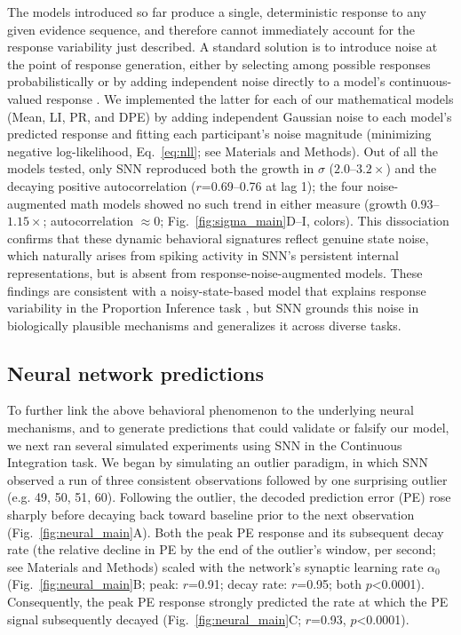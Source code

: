 \documentclass[12pt]{article}
\begin{document}
The models introduced so far produce a single, deterministic response to any given evidence sequence, and therefore cannot immediately account for the response variability just described. A standard solution is to introduce noise at the point of response generation, either by selecting among possible responses probabilistically \cite{sutton2018reinforcement} or by adding independent noise directly to a model's continuous-valued response \cite{nassar2010approximately, piray2021model}. We implemented the latter for each of our mathematical models (Mean, LI, PR, and DPE) by adding independent Gaussian noise to each model's predicted response and fitting each participant's noise magnitude (minimizing negative log-likelihood, Eq.~\ref{eq:nll}; see Materials and Methods). Out of all the models tested, only SNN reproduced both the growth in $\sigma$ ($2.0$--$3.2\times$) and the decaying positive autocorrelation ($r$=0.69--0.76 at lag 1); the four noise-augmented math models showed no such trend in either measure (growth $0.93$--$1.15\times$; autocorrelation $\approx0$; Fig.~\ref{fig:sigma_main}D--I, colors). This dissociation confirms that these dynamic behavioral signatures reflect genuine state noise, which naturally arises from spiking activity in SNN's persistent internal representations, but is absent from response-noise-augmented models. These findings are consistent with a noisy-state-based model that explains response variability in the Proportion Inference task \cite{prat2024imprecise}, but SNN grounds this noise in biologically plausible mechanisms and generalizes it across diverse tasks.

\subsection{Neural network predictions}
To further link the above behavioral phenomenon to the underlying neural mechanisms, and to generate predictions that could validate or falsify our model, we next ran several simulated experiments using SNN in the Continuous Integration task. We began by simulating an outlier paradigm, in which SNN observed a run of three consistent observations followed by one surprising outlier (e.g. 49, 50, 51, 60). Following the outlier, the decoded prediction error (PE) rose sharply before decaying back toward baseline prior to the next observation (Fig.~\ref{fig:neural_main}A). Both the peak PE response and its subsequent decay rate (the relative decline in PE by the end of the outlier's window, per second; see Materials and Methods) scaled with the network's synaptic learning rate $\alpha_0$ (Fig.~\ref{fig:neural_main}B; peak: $r$=0.91; decay rate: $r$=0.95; both $p$<0.0001). Consequently, the peak PE response strongly predicted the rate at which the PE signal subsequently decayed (Fig.~\ref{fig:neural_main}C; $r$=0.93, $p$<0.0001).
\end{document}
